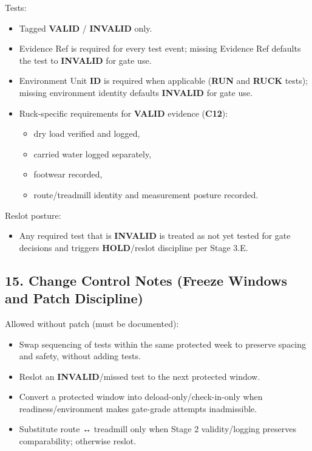 \documentclass[10pt]{article}
\begin{document}
\begin{landscape}
Tests:

\begin{itemize}
\item Tagged \textbf{VALID} / \textbf{INVALID} only.
\item Evidence Ref is required for every test event; missing Evidence Ref defaults the test to \textbf{INVALID} for gate use.
\item Environment Unit \textbf{ID} is required when applicable (\textbf{RUN} and \textbf{RUCK} tests); missing environment identity defaults \textbf{INVALID} for gate use.
\item Ruck-specific requirements for \textbf{VALID} evidence (\textbf{C12}):
  \begin{itemize}
  \item dry load verified and logged,
  \item carried water logged separately,
  \item footwear recorded,
  \item route/treadmill identity and measurement posture recorded.
  \end{itemize}
\end{itemize}

Reslot posture:

\begin{itemize}
\item Any required test that is \textbf{INVALID} is treated as not yet tested for gate decisions and triggers \textbf{HOLD}/reslot discipline per Stage 3.E.
\end{itemize}

\end{landscape}

\subsection*{15. Change Control Notes (Freeze Windows and Patch Discipline)}


Allowed without patch (must be documented):

\begin{itemize}
\item Swap sequencing of tests within the same protected week to preserve spacing and safety, without adding tests.
\item Reslot an \textbf{INVALID}/missed test to the next protected window.
\item Convert a protected window into deload-only/check-in-only when readiness/environment makes gate-grade attempts inadmissible.
\item Substitute route ↔ treadmill only when Stage 2 validity/logging preserves comparability; otherwise reslot.
\end{itemize}
\end{document}
